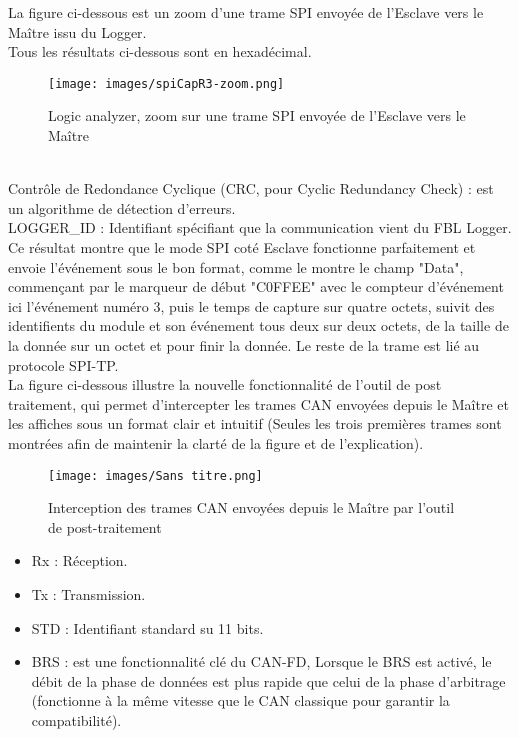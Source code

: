 \documentclass[a4paper, 12pt]{report}
\begin{document}
La figure ci-dessous est un zoom d'une trame SPI envoyée de l'Esclave vers le Maître issu du Logger.\\ 

Tous les résultats ci-dessous sont en hexadécimal.\\
    \begin{figure}[H]
    \centering
    \texttt{[image: images/spiCapR3-zoom.png]}
       \caption{Logic analyzer, zoom sur une trame SPI envoyée de l'Esclave vers le Maître}
       \label{fig:testU_L2}
   \end{figure}

\\
Contrôle de Redondance Cyclique (\acs{CRC}, pour Cyclic Redundancy Check) : est un algorithme de détection d’erreurs.\\

LOGGER\_ID : Identifiant spécifiant que la communication vient du FBL Logger.\\

Ce résultat montre que le mode SPI coté Esclave fonctionne parfaitement et envoie l'événement sous le bon format, comme le montre le champ "Data", commençant par le marqueur de début "C0FFEE" avec le compteur d'événement ici l'événement numéro 3, puis le temps de capture sur quatre octets, suivit des identifients du module et son événement tous deux sur deux octets, de la taille de la donnée sur un octet et pour finir la donnée. Le reste de la trame est lié au protocole SPI-TP.
\\

La figure ci-dessous illustre la nouvelle fonctionnalité de l'outil de post traitement, qui permet d'intercepter les trames CAN envoyées depuis le Maître et les affiches sous un format clair et intuitif (Seules les trois premières trames sont montrées afin de maintenir la clarté de la figure et de l'explication).
    \begin{figure}[H]
    \centering
    \texttt{[image: images/Sans titre.png]}
       \caption{Interception des trames CAN envoyées depuis le Maître par l'outil de post-traitement}
       \label{fig:testU_L2}
   \end{figure}
   \begin{itemize}
       \item Rx : Réception.
       \item Tx : Transmission.
       \item STD : Identifiant standard su 11 bits.
        \item \ac{BRS} : est une fonctionnalité clé du CAN-FD, Lorsque le BRS est activé, le débit de la phase de données est plus rapide que celui de la phase d'arbitrage (fonctionne à la même vitesse que le CAN classique pour garantir la compatibilité).\\
   \end{itemize}
   
\end{document}
